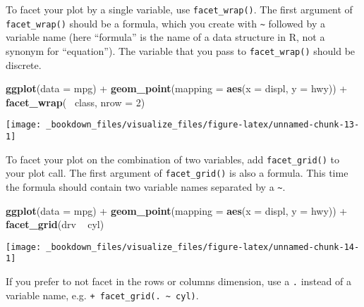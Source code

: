 \documentclass[]{book}
\newenvironment{Shaded}{\begin{snugshade}}{\end{snugshade}}
\newcommand{\KeywordTok}[1]{\textcolor[rgb]{0.13,0.29,0.53}{\textbf{{#1}}}}
\newcommand{\DataTypeTok}[1]{\textcolor[rgb]{0.13,0.29,0.53}{{#1}}}
\newcommand{\DecValTok}[1]{\textcolor[rgb]{0.00,0.00,0.81}{{#1}}}
\newcommand{\StringTok}[1]{\textcolor[rgb]{0.31,0.60,0.02}{{#1}}}
\newcommand{\NormalTok}[1]{{#1}}
\begin{document}
To facet your plot by a single variable, use \texttt{facet\_wrap()}. The
first argument of \texttt{facet\_wrap()} should be a formula, which you
create with \texttt{\textasciitilde{}} followed by a variable name (here
``formula'' is the name of a data structure in R, not a synonym for
``equation''). The variable that you pass to \texttt{facet\_wrap()}
should be discrete.

\begin{Shaded}
\begin{Highlighting}[]
\KeywordTok{ggplot}\NormalTok{(}\DataTypeTok{data =} \NormalTok{mpg) +}\StringTok{ }
\StringTok{  }\KeywordTok{geom_point}\NormalTok{(}\DataTypeTok{mapping =} \KeywordTok{aes}\NormalTok{(}\DataTypeTok{x =} \NormalTok{displ, }\DataTypeTok{y =} \NormalTok{hwy)) +}\StringTok{ }
\StringTok{  }\KeywordTok{facet_wrap}\NormalTok{(~}\StringTok{ }\NormalTok{class, }\DataTypeTok{nrow =} \DecValTok{2}\NormalTok{)}
\end{Highlighting}
\end{Shaded}

\begin{center}\texttt{[image: \_bookdown\_files/visualize\_files/figure-latex/unnamed-chunk-13-1]} \end{center}

To facet your plot on the combination of two variables, add
\texttt{facet\_grid()} to your plot call. The first argument of
\texttt{facet\_grid()} is also a formula. This time the formula should
contain two variable names separated by a \texttt{\textasciitilde{}}.

\begin{Shaded}
\begin{Highlighting}[]
\KeywordTok{ggplot}\NormalTok{(}\DataTypeTok{data =} \NormalTok{mpg) +}\StringTok{ }
\StringTok{  }\KeywordTok{geom_point}\NormalTok{(}\DataTypeTok{mapping =} \KeywordTok{aes}\NormalTok{(}\DataTypeTok{x =} \NormalTok{displ, }\DataTypeTok{y =} \NormalTok{hwy)) +}\StringTok{ }
\StringTok{  }\KeywordTok{facet_grid}\NormalTok{(drv ~}\StringTok{ }\NormalTok{cyl)}
\end{Highlighting}
\end{Shaded}

\begin{center}\texttt{[image: \_bookdown\_files/visualize\_files/figure-latex/unnamed-chunk-14-1]} \end{center}

If you prefer to not facet in the rows or columns dimension, use a
\texttt{.} instead of a variable name, e.g.
\texttt{+\ facet\_grid(.\ \textasciitilde{}\ cyl)}.
\end{document}
